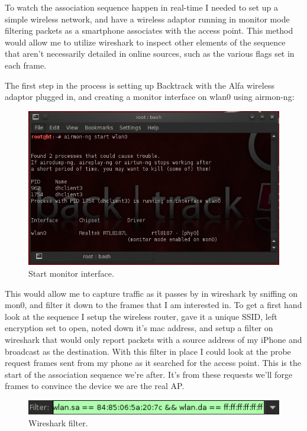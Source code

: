 To watch the association sequence happen in real-time I needed to set up a simple wireless network, and have a wireless adaptor running in monitor mode filtering packets as a smartphone associates with the access point. This method would allow me to utilize wireshark to inspect other elements of the sequence that aren’t necessarily detailed in online sources, such as the various flags set in each frame.

The first step in the process is setting up Backtrack with the Alfa wireless adaptor plugged in, and creating a monitor interface on wlan0 using airmon-ng:

\begin{figure}[htb!]
\includegraphics[width=\linewidth]{research/80211/figures/bt1.png}
\caption{Start monitor interface.}
\label{research:80211:bt1}
\end{figure}

This would allow me to capture traffic as it passes by in wireshark by sniffing on mon0, and filter it down to the frames that I am interested in. To get a first hand look at the sequence I setup the wireless router, gave it a unique SSID, left encryption set to open, noted down it’s mac address, and setup a filter on wireshark that would only report packets with a source address of my iPhone and broadcast as the destination. With this filter in place I could look at the probe request frames sent from my phone as it searched for the access point. This is the start of the association sequence we’re after. It’s from these requests we’ll forge frames to convince the device we are the real AP.

\begin{figure}[htb!]
\includegraphics[width=\linewidth]{research/80211/figures/bt2.png}
\caption{Wireshark filter.}
\label{research:80211:bt2}
\end{figure}

